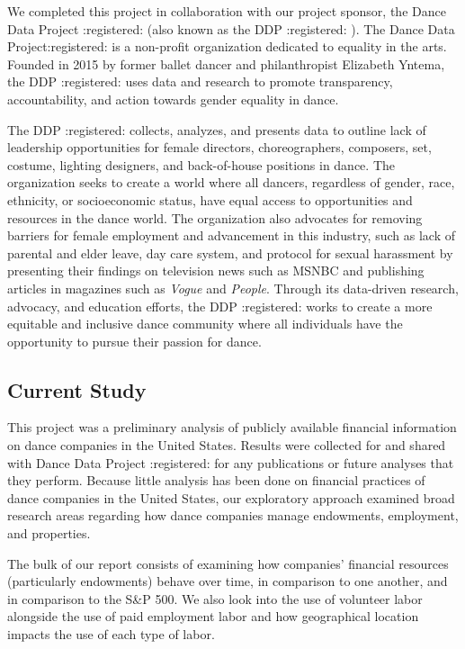 \documentclass[Dance Data
Project,article,submit,moreauthors,pdftex]{mdpi}
\begin{document}
We completed this project in collaboration with our project sponsor, the
Dance Data Project :registered: (also known as the DDP :registered: ).
The Dance Data Project:registered: is a non-profit organization
dedicated to equality in the arts. Founded in 2015 by former ballet
dancer and philanthropist Elizabeth Yntema, the DDP :registered: uses
data and research to promote transparency, accountability, and action
towards gender equality in dance.

The DDP :registered: collects, analyzes, and presents data to outline
lack of leadership opportunities for female directors, choreographers,
composers, set, costume, lighting designers, and back-of-house positions
in dance. The organization seeks to create a world where all dancers,
regardless of gender, race, ethnicity, or socioeconomic status, have
equal access to opportunities and resources in the dance world. The
organization also advocates for removing barriers for female employment
and advancement in this industry, such as lack of parental and elder
leave, day care system, and protocol for sexual harassment by presenting
their findings on television news such as MSNBC and publishing articles
in magazines such as \emph{Vogue} and \emph{People}. Through its
data-driven research, advocacy, and education efforts, the DDP
:registered: works to create a more equitable and inclusive dance
community where all individuals have the opportunity to pursue their
passion for dance.

\hypertarget{current-study}{%
\subsection{Current Study}\label{current-study}}

This project was a preliminary analysis of publicly available financial
information on dance companies in the United States. Results were
collected for and shared with Dance Data Project :registered: for any
publications or future analyses that they perform. Because little
analysis has been done on financial practices of dance companies in the
United States, our exploratory approach examined broad research areas
regarding how dance companies manage endowments, employment, and
properties.

The bulk of our report consists of examining how companies' financial
resources (particularly endowments) behave over time, in comparison to
one another, and in comparison to the S\&P 500. We also look into the
use of volunteer labor alongside the use of paid employment labor and
how geographical location impacts the use of each type of labor.
\end{document}
